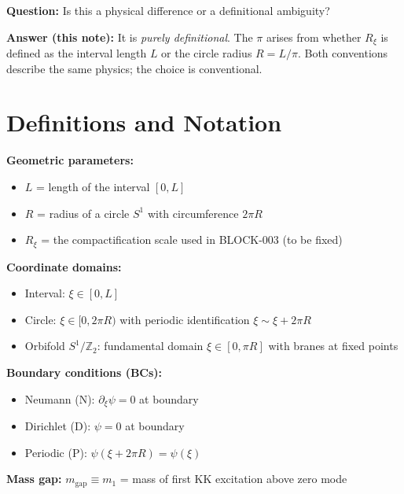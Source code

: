 \documentclass[11pt,a4paper]{article}
\newcommand{\Rxi}{R_\xi}
\newcommand{\mgap}{m_{\mathrm{gap}}}
\begin{document}
\textbf{Question:} Is this a physical difference or a definitional ambiguity?

\textbf{Answer (this note):} It is \emph{purely definitional}. The $\pi$ arises from
whether $\Rxi$ is defined as the interval length $L$ or the circle radius $R = L/\pi$.
Both conventions describe the same physics; the choice is conventional.

\section{Definitions and Notation}

\begin{tcolorbox}[title=Master Definitions, colback=blue!5, colframe=blue!50]
\textbf{Geometric parameters:}
\begin{itemize}
\item $L$ = length of the interval $[0, L]$
\item $R$ = radius of a circle $S^1$ with circumference $2\pi R$
\item $\Rxi$ = the compactification scale used in BLOCK-003 (to be fixed)
\end{itemize}

\textbf{Coordinate domains:}
\begin{itemize}
\item Interval: $\xi \in [0, L]$
\item Circle: $\xi \in [0, 2\pi R)$ with periodic identification $\xi \sim \xi + 2\pi R$
\item Orbifold $S^1/\mathbb{Z}_2$: fundamental domain $\xi \in [0, \pi R]$ with branes at fixed points
\end{itemize}

\textbf{Boundary conditions (BCs):}
\begin{itemize}
\item Neumann (N): $\partial_\xi \psi = 0$ at boundary
\item Dirichlet (D): $\psi = 0$ at boundary
\item Periodic (P): $\psi(\xi + 2\pi R) = \psi(\xi)$
\end{itemize}

\textbf{Mass gap:} $\mgap \equiv m_1$ = mass of first KK excitation above zero mode
\end{tcolorbox}

\end{document}
